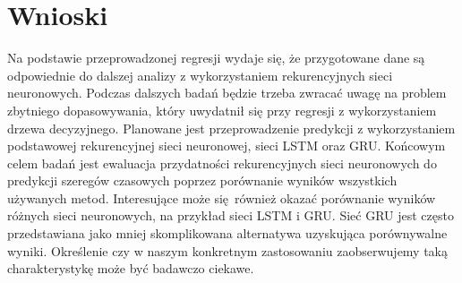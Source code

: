 \documentclass{article}
\begin{document}
	\section{Wnioski}
	Na podstawie przeprowadzonej regresji wydaje się, że przygotowane dane są odpowiednie do dalszej analizy z wykorzystaniem rekurencyjnych sieci neuronowych. Podczas dalszych badań będzie trzeba zwracać uwagę na problem zbytniego dopasowywania, który uwydatnił się przy regresji z wykorzystaniem drzewa decyzyjnego. Planowane jest przeprowadzenie predykcji z wykorzystaniem podstawowej rekurencyjnej sieci neuronowej, sieci LSTM oraz GRU. Końcowym celem badań jest ewaluacja przydatności rekurencyjnych sieci neuronowych do predykcji szeregów czasowych poprzez porównanie wyników wszystkich używanych metod. Interesujące może się również okazać porównanie wyników różnych sieci neuronowych, na przykład sieci LSTM i GRU. Sieć GRU jest często przedstawiana jako mniej skomplikowana alternatywa uzyskująca porównywalne wyniki. Określenie czy w naszym konkretnym zastosowaniu zaobserwujemy taką charakterystykę może być badawczo ciekawe.
\end{document}
